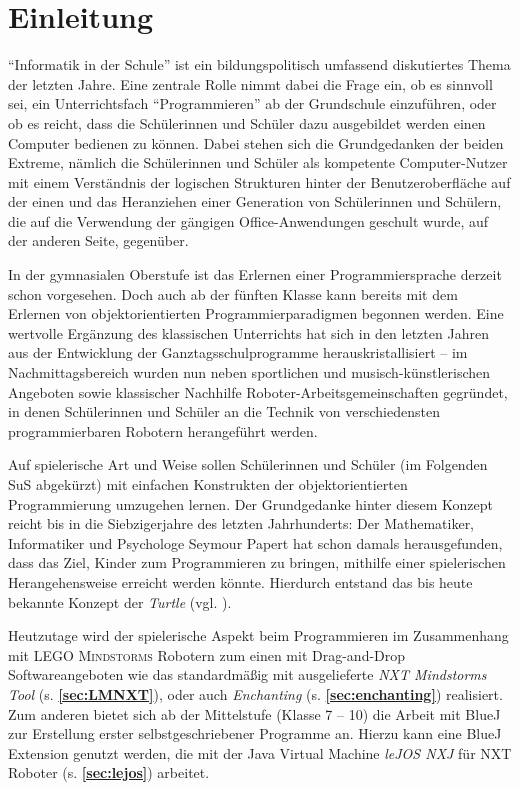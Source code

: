 \documentclass[paper=a4, DIV=calc, BCOR=12mm, twoside=on, onecolumn=on, open = right, titlepage =on, parskip =half-, headsepline = on, footsepline = off, chapterprefix = off, appendixprefix = on, fontsize = 12pt, numbers = noenddot, abstract = on]{scrbook}
\begin{document}
\chapter{Einleitung}
\label{sec:einleitung}
\onehalfspacing
"`Informatik in der Schule"' ist ein bildungspolitisch umfassend diskutiertes Thema der letzten Jahre. Eine zentrale Rolle nimmt dabei die Frage ein, ob es sinnvoll sei, ein Unterrichtsfach "`Programmieren"' ab der Grundschule einzuführen, oder ob es reicht, dass die Schülerinnen und Schüler dazu ausgebildet werden einen Computer bedienen zu können. Dabei stehen sich die Grundgedanken der beiden Extreme, nämlich die Schülerinnen und Schüler als kompetente Computer-Nutzer mit einem Verständnis der logischen Strukturen hinter der Benutzeroberfläche auf der einen und das Heranziehen einer Generation von Schülerinnen und Schülern, die auf die Verwendung der gängigen Office-Anwendungen geschult wurde, auf der anderen Seite, gegenüber.

In der gymnasialen Oberstufe ist das Erlernen einer Programmiersprache derzeit schon vorgesehen. Doch auch ab der fünften Klasse kann bereits mit dem Erlernen von objektorientierten Programmierparadigmen begonnen werden. Eine wertvolle Ergänzung des klassischen Unterrichts hat sich in den letzten Jahren aus der Entwicklung der Ganztagsschulprogramme herauskristallisiert -- im Nachmittagsbereich wurden nun neben sportlichen und musisch-künstlerischen Angeboten sowie klassischer Nachhilfe Roboter-Arbeitsgemeinschaften gegründet, in denen Schülerinnen und Schüler an die Technik von verschiedensten programmierbaren Robotern herangeführt werden.

Auf spielerische Art und Weise sollen Schülerinnen und Schüler (im Folgenden SuS abgekürzt) mit einfachen Konstrukten der objektorientierten Programmierung umzugehen lernen. Der Grundgedanke hinter diesem Konzept reicht bis in die Siebzigerjahre des letzten Jahrhunderts: Der Mathematiker, Informatiker und Psychologe Seymour Papert hat schon damals herausgefunden, dass das Ziel, Kinder zum Programmieren zu bringen, mithilfe einer spielerischen Herangehensweise erreicht werden könnte. Hierdurch entstand das bis heute bekannte Konzept der \emph{Turtle} (vgl. \cite[S.365]{nievergelt:99}).

Heutzutage wird der spielerische Aspekt beim Programmieren im Zusammenhang mit \textsc{LEGO Mindstorms} Robotern zum einen mit Drag-and-Drop Softwareangeboten wie das standardmäßig mit ausgelieferte \emph{NXT Mindstorms Tool} (s.  \textbf{\ref{sec:LMNXT}}), oder auch \emph{Enchanting} (s. \textbf{\ref{sec:enchanting}}) realisiert. Zum anderen bietet sich ab der Mittelstufe (Klasse 7 -- 10) die Arbeit mit BlueJ zur Erstellung erster selbstgeschriebener Programme an. Hierzu kann eine BlueJ Extension genutzt werden, die mit der Java Virtual Machine \emph{leJOS NXJ} für NXT Roboter (s. \textbf{\ref{sec:lejos}}) arbeitet.
\end{document}
